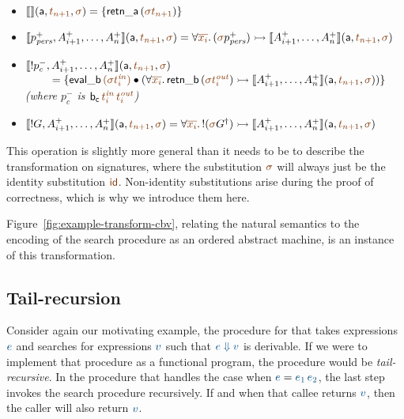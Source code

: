 \smallskip
\begin{itemize}
\item $\opbasic{}{t_{n+1}}{\sigma} = \{ {\sf retn\_a}\,(\lf{\sigma{t_{n+1}}}) \}$
\item $\opbasic{p^+_\mpers,A^+_{i+1},\ldots,A^+_n}{t_{n+1}}{\sigma} 
  = \forall \lf{\overline{x_i}}.\, (\lf\sigma{p^+_\mpers}) \lefti \opbasic{A^+_{i+1},\ldots,A^+_n}{t_{n+1}}{\sigma}$
\item $\opbasic{{!}p^-_c,A^+_{i+1},\ldots,A^+_n}{t_{n+1}}{\sigma}$
  \\
  $~ \qquad = \{ {\sf eval\_b}\,\lf{({\sigma}t^{\it in}_i)} \fuse
  (\forall\lf{\overline{x_i}}.\, {\sf retn\_b}\,(\lf{\sigma t^{\it out}_i})
  \lefti \opbasic{A^+_{i+1},\ldots,A^+_n}{t_{n+1}}{\sigma}) \}$\\
  {\it (where $p^-_c$ is ${\sf b_c}\,\lf{t^{\it in}_i}\,\lf{t^{\it out}_i}$)}
\item $\opbasic{{!}G,A^+_{i+1},\ldots,A^+_n}{t_{n+1}}{\sigma} = \forall
  \lf{\overline{x_i}}.\, {!}(\lf\sigma\opsubst{G}) \lefti
  \opbasic{A^+_{i+1},\ldots,A^+_n}{t_{n+1}}{\sigma}$
\end{itemize}
\smallskip

\noindent
This operation is slightly more general than it needs to be to
describe the transformation on signatures, where the substitution
$\lf\sigma$ will always just be the identity substitution $\lf{\sf id}$.
Non-identity substitutions arise during the proof of correctness, which
is why we introduce them here.

Figure~\ref{fig:example-transform-cbv}, relating the natural semantics
to the encoding of the search procedure as an ordered abstract
machine, is an instance of this transformation.

\subsection{Tail-recursion}
\label{sec:trans-tail}

Consider again our motivating example, the procedure for that takes
expressions $\obj{e}$ and searches for expressions $\obj{v}$ such that
$\obj{e \Downarrow v}$ is derivable. If we were to implement that
procedure as a functional program, the procedure would be {\it
  tail-recursive}. In the procedure that handles the case when
$\obj{e} = \obj{e_1\,e_2}$, the last step invokes the search procedure
recursively. If and when that callee returns $\obj{v}$, then the
caller will also return $\obj{v}$.


